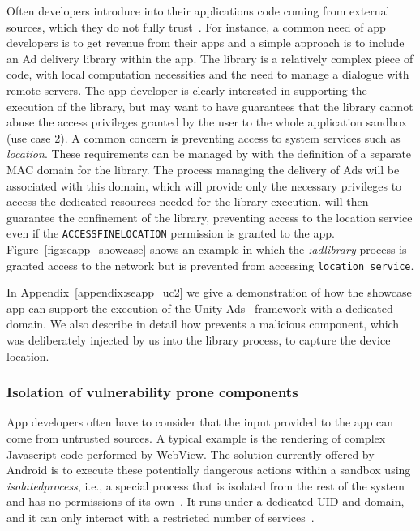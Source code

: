 Often developers introduce into their applications code coming from
external sources, which they do not fully trust~\cite{seapp_7958574,
  seapp_10.1145/2414456.2414498, seapp_demetriou2016free}.  For
instance, a common need of app developers is to get revenue from their
apps and a simple approach is to include an Ad delivery library within
the app.  The library is a relatively complex piece of code, with
local computation necessities and the need to manage a dialogue with
remote servers.  The app developer is clearly interested in supporting
the execution of the library, but may want to have guarantees that the
library cannot abuse the access privileges granted by the user to the
whole application sandbox (use case 2).  A common concern is
preventing access to system services such as {\em location}.  These
requirements can be managed by \pap with the definition of a separate
MAC domain for the library.  The process managing the delivery of Ads
will be associated with this domain, which will provide only the
necessary privileges to access the dedicated resources needed for the
library execution.  \sel will then guarantee the confinement of the
library, preventing access to the location service even if the
\texttt{ACCESS\textunderscore FINE\textunderscore LOCATION} permission
is granted to the app.  Figure~\ref{fig:seapp_showcase} shows an
example in which the {\em :adlibrary} process is granted access to the
network but is prevented from accessing \texttt{location service}.

In Appendix~\ref{appendix:seapp_uc2} we give a demonstration of how
the showcase app can support the execution of the Unity
Ads~\cite{seapp_unityads} framework with a dedicated \sel domain. We
also describe in detail how \pap prevents a malicious component, which
was deliberately injected by us into the library process, to capture
the device location.


\subsubsection{Isolation of vulnerability prone
  components}\label{sect:seapp_int_comp_isolation}

App developers often have to consider that the input provided to the
app can come from untrusted sources.  A typical example is the
rendering of complex Javascript code performed by WebView.  The
solution currently offered by Android is to execute these potentially
dangerous actions within a sandbox using {\em isolatedprocess}, i.e.,
a special process that is isolated from the rest of the system and has
no permissions of its own~\cite{seapp_isolatedprocess_perm}.  It runs
under a dedicated UID and \sel domain, and it can only interact with a
restricted number of services~\cite{seapp_isolated_app_te}.

